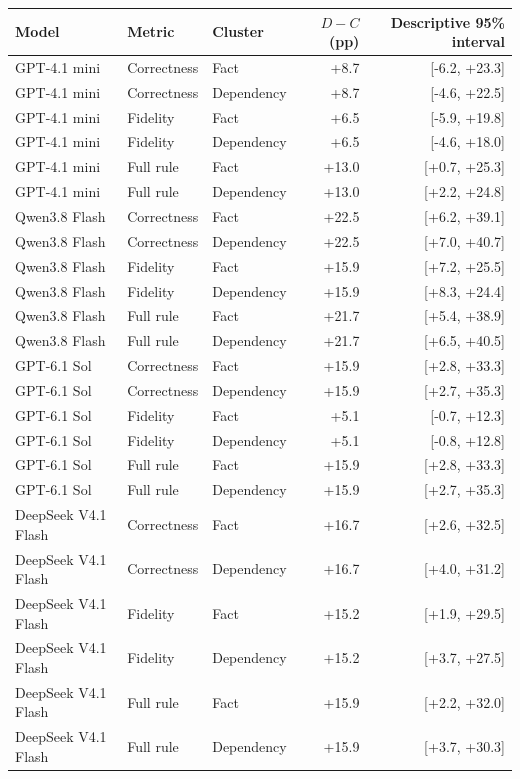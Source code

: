 \begin{tabular}{lllrr}
\toprule
Model & Metric & Cluster & $D-C$ (pp) & Descriptive 95\% interval \\
\midrule
GPT-4.1 mini & Correctness & Fact & +8.7 & [-6.2, +23.3] \\
GPT-4.1 mini & Correctness & Dependency & +8.7 & [-4.6, +22.5] \\
GPT-4.1 mini & Fidelity & Fact & +6.5 & [-5.9, +19.8] \\
GPT-4.1 mini & Fidelity & Dependency & +6.5 & [-4.6, +18.0] \\
GPT-4.1 mini & Full rule & Fact & +13.0 & [+0.7, +25.3] \\
GPT-4.1 mini & Full rule & Dependency & +13.0 & [+2.2, +24.8] \\
Qwen3.8 Flash & Correctness & Fact & +22.5 & [+6.2, +39.1] \\
Qwen3.8 Flash & Correctness & Dependency & +22.5 & [+7.0, +40.7] \\
Qwen3.8 Flash & Fidelity & Fact & +15.9 & [+7.2, +25.5] \\
Qwen3.8 Flash & Fidelity & Dependency & +15.9 & [+8.3, +24.4] \\
Qwen3.8 Flash & Full rule & Fact & +21.7 & [+5.4, +38.9] \\
Qwen3.8 Flash & Full rule & Dependency & +21.7 & [+6.5, +40.5] \\
GPT-6.1 Sol & Correctness & Fact & +15.9 & [+2.8, +33.3] \\
GPT-6.1 Sol & Correctness & Dependency & +15.9 & [+2.7, +35.3] \\
GPT-6.1 Sol & Fidelity & Fact & +5.1 & [-0.7, +12.3] \\
GPT-6.1 Sol & Fidelity & Dependency & +5.1 & [-0.8, +12.8] \\
GPT-6.1 Sol & Full rule & Fact & +15.9 & [+2.8, +33.3] \\
GPT-6.1 Sol & Full rule & Dependency & +15.9 & [+2.7, +35.3] \\
DeepSeek V4.1 Flash & Correctness & Fact & +16.7 & [+2.6, +32.5] \\
DeepSeek V4.1 Flash & Correctness & Dependency & +16.7 & [+4.0, +31.2] \\
DeepSeek V4.1 Flash & Fidelity & Fact & +15.2 & [+1.9, +29.5] \\
DeepSeek V4.1 Flash & Fidelity & Dependency & +15.2 & [+3.7, +27.5] \\
DeepSeek V4.1 Flash & Full rule & Fact & +15.9 & [+2.2, +32.0] \\
DeepSeek V4.1 Flash & Full rule & Dependency & +15.9 & [+3.7, +30.3] \\
\bottomrule
\end{tabular}
